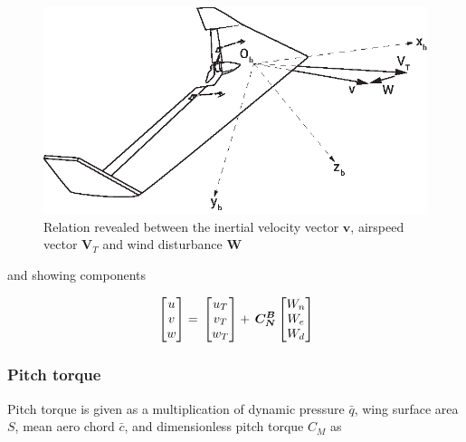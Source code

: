 \begin{figure}
\begin{center}
\includegraphics[width=13cm]{figures/ZagiWindDisturbance}    %
\caption{Relation revealed between the inertial velocity vector $\bm{v}$, airspeed vector $\bm{V}_T$ and wind disturbance $\bm{W}$ \cite{ducard2009fault}} 
\label{fig:windDisturbance}
\end{center}
\end{figure}

and showing components

\begin{equation}{\label{eqn:inertialVelocityAirspeedVectorWindComponents}}
\begin{bmatrix}
u \\
v\\
w\\
\end{bmatrix}
=\,
\begin{bmatrix}
u_{T} \\
v_{T}\\
w_{T}\\
\end{bmatrix}
+\,
\bm{C_N^B}
\begin{bmatrix}
W_n \\
W_e\\
W_d\\
\end{bmatrix}
\end{equation}


\subsubsection{Pitch torque}

Pitch torque is given as a multiplication of dynamic pressure $\bar{q}$, wing surface area $S$, mean aero chord $\bar{c}$,  and dimensionless pitch torque $C_M$ as 

